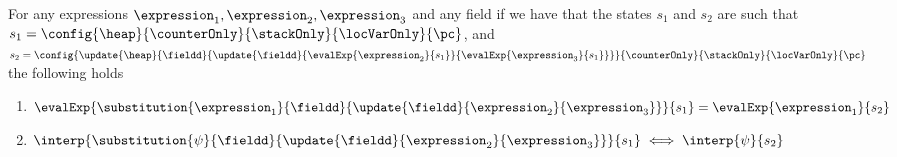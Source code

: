 \begin{substHeap}\label{substHeap}
For any expressions $ \expression_1, \expression_2, \expression_3 $ and any field \fieldd
if we have that the states $s_1$ and $s_2$ are such that
 $s_1 =   \config{\heap}{\counterOnly}{ \stackOnly }{\locVarOnly}{\pc }$,%
 and \\
   $s_2 =  \config{ \update{\heap}{\fieldd }{\update{\fieldd}
                                                   {\evalExp{\expression_2}{ s_1 } }
                                                   {\evalExp{ \expression_3}{ s_1 } } } }
                                          {\counterOnly}{ \stackOnly }{\locVarOnly}{\pc }   $  the following holds
\begin{enumerate}
  \item $ \evalExp{\substitution{\expression_1}{\fieldd}{ \update{ \fieldd  }{\expression_2}{\expression_3} }}{ s_1 } =  \evalExp{\expression_1}{ s_2  }  $
  \item $ \interp{\substitution{\psi}{\fieldd}{ \update{ \fieldd  }{\expression_2}{\expression_3} }}{ s_1 } \iff  \interp{\psi}{ s_2  }  $
\end{enumerate}
\end{substHeap}


